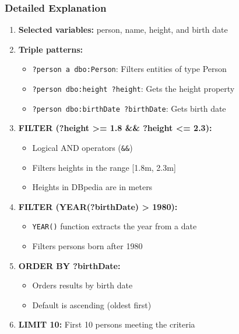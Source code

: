 \documentclass[12pt,a4paper]{article}
\begin{document}
\subsubsection{Detailed Explanation}

\begin{enumerate}
    \item \textbf{Selected variables:} person, name, height, and birth date
    
    \item \textbf{Triple patterns:}
    \begin{itemize}
        \item \texttt{?person a dbo:Person}: Filters entities of type Person
        \item \texttt{?person dbo:height ?height}: Gets the height property
        \item \texttt{?person dbo:birthDate ?birthDate}: Gets birth date
    \end{itemize}
    
    \item \textbf{FILTER (?height >= 1.8 \&\& ?height <= 2.3):} 
    \begin{itemize}
        \item Logical AND operators (\texttt{\&\&})
        \item Filters heights in the range [1.8m, 2.3m]
        \item Heights in DBpedia are in meters
    \end{itemize}
    
    \item \textbf{FILTER (YEAR(?birthDate) > 1980):}
    \begin{itemize}
        \item \texttt{YEAR()} function extracts the year from a date
        \item Filters persons born after 1980
    \end{itemize}
    
    \item \textbf{ORDER BY ?birthDate:} 
    \begin{itemize}
        \item Orders results by birth date
        \item Default is ascending (oldest first)
    \end{itemize}
    
    \item \textbf{LIMIT 10:} First 10 persons meeting the criteria
\end{enumerate}
\end{document}
